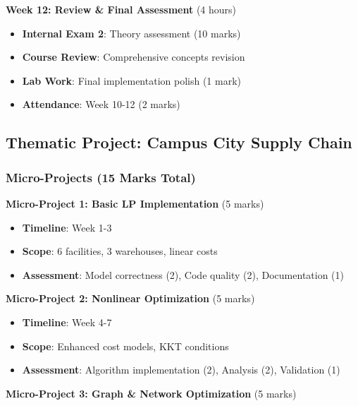 \documentclass[
  letterpaper,
  DIV=11,
  numbers=noendperiod]{scrreprt}
\providecommand{\tightlist}{%
  \setlength{\itemsep}{0pt}\setlength{\parskip}{0pt}}
\begin{document}
\textbf{Week 12: Review \& Final Assessment} (4 hours)

\begin{itemize}
\tightlist
\item
  \textbf{Internal Exam 2}: Theory assessment (10 marks)
\item
  \textbf{Course Review}: Comprehensive concepts revision
\item
  \textbf{Lab Work}: Final implementation polish (1 mark)
\item
  \textbf{Attendance}: Week 10-12 (2 marks)
\end{itemize}

\subsection*{Thematic Project: Campus City Supply
Chain}\label{thematic-project-campus-city-supply-chain}

\subsubsection*{Micro-Projects (15 Marks
Total)}\label{micro-projects-15-marks-total}

\textbf{Micro-Project 1: Basic LP Implementation} (5 marks)

\begin{itemize}
\tightlist
\item
  \textbf{Timeline}: Week 1-3
\item
  \textbf{Scope}: 6 facilities, 3 warehouses, linear costs
\item
  \textbf{Assessment}: Model correctness (2), Code quality (2),
  Documentation (1)
\end{itemize}

\textbf{Micro-Project 2: Nonlinear Optimization} (5 marks)

\begin{itemize}
\tightlist
\item
  \textbf{Timeline}: Week 4-7
\item
  \textbf{Scope}: Enhanced cost models, KKT conditions
\item
  \textbf{Assessment}: Algorithm implementation (2), Analysis (2),
  Validation (1)
\end{itemize}

\textbf{Micro-Project 3: Graph \& Network Optimization} (5 marks)
\end{document}
